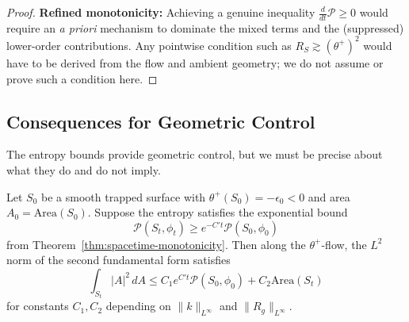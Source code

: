 \begin{proof}
\textbf{Refined monotonicity:} Achieving a genuine inequality $\frac{d}{dt}\mathcal{P} \geq 0$ would require an 
\emph{a priori} mechanism to dominate the mixed terms and the (suppressed) lower-order contributions. Any pointwise condition such as $R_S \gtrsim (\theta^+)^2$ would have to be derived from the flow and ambient geometry; we do not assume or prove such a condition here.
\end{proof}

\subsection{Consequences for Geometric Control}

The entropy bounds provide geometric control, but we must be precise about what they do and do not imply.

\begin{corollary}
\label{cor:curvature-bounds}
Let $S_0$ be a smooth trapped surface with $\theta^+(S_0) = -\epsilon_0 < 0$ and area $A_0 = \mathrm{Area}(S_0)$. Suppose the entropy satisfies the exponential bound
\begin{equation}
\mathcal{P}(S_t, \phi_t) \geq e^{-C't}\mathcal{P}(S_0, \phi_0)
\end{equation}
from Theorem~\ref{thm:spacetime-monotonicity}. Then along the $\theta^+$-flow, the $L^2$ norm of the second fundamental form satisfies
\begin{equation}
\int_{S_t} |A|^2 \, dA \leq C_1 e^{C't}\mathcal{P}(S_0, \phi_0) + C_2 \mathrm{Area}(S_t)
\end{equation}
for constants $C_1, C_2$ depending on $\|k\|_{L^\infty}$ and $\|R_g\|_{L^\infty}$.
\end{corollary}

